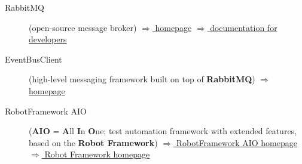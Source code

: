 \label{LINKS}
\begin{description}
    \item[RabbitMQ] (open-source message broker)\newline
            \href{https://www.rabbitmq.com/}{$\Rightarrow$ homepage}\newline
            \href{https://www.rabbitmq.com/docs/use-rabbitmq/}{$\Rightarrow$ documentation for developers}
    \item[EventBusClient] (high-level messaging framework built on top of \textbf{RabbitMQ})\newline
            \href{https://github.com/test-fullautomation/python-rabbitmq-messagebus}{$\Rightarrow$ homepage}

    \item[RobotFramework AIO] (\textbf{AIO} = \textbf{A}ll \textbf{I}n \textbf{O}ne; test automation framework
                               with extended features, based on the \textbf{Robot Framework})\newline
            \href{https://robotframework-aio.org/}{$\Rightarrow$ RobotFramework AIO homepage}\newline
            \href{https://robotframework.org/}{$\Rightarrow$ Robot Framework homepage}


\end{description}

